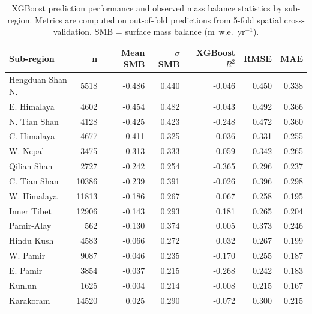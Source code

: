 \begin{table}[htbp]
\centering
\caption{XGBoost prediction performance and observed mass balance statistics by sub-region. Metrics are computed on out-of-fold predictions from 5-fold spatial cross-validation. SMB = surface mass balance (m~w.e.~yr$^{-1}$).}
\label{tab:regional_performance}
\begin{tabular}{lrrrrrr}
\hline
Sub-region & n & Mean SMB & $\sigma$ SMB & XGBoost $R^2$ & RMSE & MAE \\
\hline
Hengduan Shan N. & 5518 & -0.486 & 0.440 & -0.046 & 0.450 & 0.338 \\
E. Himalaya & 4602 & -0.454 & 0.482 & -0.043 & 0.492 & 0.366 \\
N. Tian Shan & 4128 & -0.425 & 0.423 & -0.248 & 0.472 & 0.360 \\
C. Himalaya & 4677 & -0.411 & 0.325 & -0.036 & 0.331 & 0.255 \\
W. Nepal & 3475 & -0.313 & 0.333 & -0.059 & 0.342 & 0.265 \\
Qilian Shan & 2727 & -0.242 & 0.254 & -0.365 & 0.296 & 0.237 \\
C. Tian Shan & 10386 & -0.239 & 0.391 & -0.026 & 0.396 & 0.298 \\
W. Himalaya & 11813 & -0.186 & 0.267 & 0.067 & 0.258 & 0.195 \\
Inner Tibet & 12906 & -0.143 & 0.293 & 0.181 & 0.265 & 0.204 \\
Pamir-Alay & 562 & -0.130 & 0.374 & 0.005 & 0.373 & 0.246 \\
Hindu Kush & 4583 & -0.066 & 0.272 & 0.032 & 0.267 & 0.199 \\
W. Pamir & 9087 & -0.046 & 0.235 & -0.170 & 0.255 & 0.187 \\
E. Pamir & 3854 & -0.037 & 0.215 & -0.268 & 0.242 & 0.183 \\
Kunlun & 1625 & -0.004 & 0.214 & -0.008 & 0.215 & 0.167 \\
Karakoram & 14520 & 0.025 & 0.290 & -0.072 & 0.300 & 0.215 \\
\hline
\end{tabular}
\end{table}